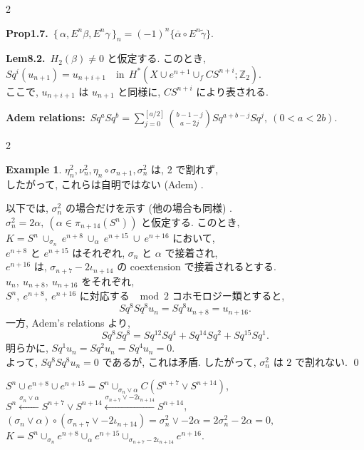 \documentclass[10pt, leqno]{ltjsarticle}
\newcommand{\todai}[2][]{\{\,#2\,\}_{#1}}      %
\newcommand{\gen}[1]{\{#1\}}       %
\newcommand{\pis}[2]{\pi_{#1}(#2)}       %
\newcommand{\z}{\mathbb{Z}}
\newcommand{\sq}[1]{Sq^{#1}}
\numberwithin{equation}{section}
\theoremstyle{plain}
\theoremstyle{definition}
\newtheorem{example}[]{Example}
\theoremstyle{remark}
\begin{document}
\begin{paracol}{2}
\switchcolumn

\noindent
\textbf{Prop1.7.}\
\(\todai[n]{\alpha, E^n\beta, E^n\gamma}
= (-1)^n\gen{\overline{\alpha}\circ E^n\widetilde{\gamma}}\).

\noindent
\textbf{Lem8.2.}\
$H_2(\beta)\ne0$ と仮定する. このとき,\\
\(
\sq{i}(u_{n+1}) = u_{n+i+1}
\quad\text{in} \ \ H^\ast (X\cup e^{n+1}\cup_f CS^{n+i}; \z_2).
\)\\
ここで, $u_{n+i+1}$ は $u_{n+1}$ と同様に, $CS^{n+i}$ により表される. 

\noindent
\textbf{Adem relations:}\ 
\(\sq{a}\sq{b} = \sum_{j=0}^{[a/2]}\binom{b-1-j}{a-2j}
\sq{a+b-j}\sq{j},\ (0<a<2b)\).



\end{paracol}

\begin{paracol}{2}

\begin{example}
$\eta_n^2, \nu_n^2, \eta_n\circ\sigma_{n+1}, \sigma_n^2$ は,
$2$ で割れず, \\
したがって, これらは自明ではない (Adem) . 
\end{example}

以下では, $\sigma_n^2$ の場合だけを示す (他の場合も同様) . \\
$\sigma_n^2=2\alpha,\ (\alpha\in\pis{n+14}{S^n})$ と仮定する. 
このとき,\\
\(
K = S^n\ \cup_{\sigma_n}\ e^{n+8}\ \cup_\alpha\ e^{n+15}\ \cup\ e^{n+16}
\)
において,\\
$e^{n+8}$ と $e^{n+15}$ はそれぞれ, $\sigma_n$ と $\alpha$
で接着され, \\
$e^{n+16}$ は, 
$\sigma_{n+7}-2\iota_{n+14}$ の coextension で接着されるとする. \\
$u_n,\ u_{n+8},\ u_{n+16}$ をそれぞれ, \\
$S^n,\ e^{n+8},\ e^{n+16}$ に対応する
$\mod 2$ コホモロジー類とすると, 
\[
\sq{8}\sq{8} u_n=\sq{8} u_{n+8}=u_{n+16}.
\]
一方, Adem's relations より,
\[
Sq^8 Sq^8 = Sq^{12} Sq^4 + Sq^{14} Sq^2 + Sq^{15} Sq^1 .
\]
明らかに,
\(\sq{1}u_n = \sq{2}u_n = \sq{4}u_n = 0\).\\
よって, $Sq^8 Sq^8 u_n = 0$ であるが, これは矛盾. 
したがって, $\sigma_n^2$ は $2$ で割れない.
\qed

\switchcolumn

\noindent
\(S^n\cup e^{n+8}\cup e^{n+15}
= S^n \cup _{\sigma_n\vee \alpha} C(S^{n+7}\vee S^{n+14})\),\\
\(S^n\xleftarrow{\sigma_n\vee\alpha}
S^{n+7}\vee S^{n+14}\xleftarrow{\sigma_{n+7}\vee -2\iota_{n+14}} S^{n+14}\),\\
\((\sigma_n\vee \alpha)\circ(\sigma_{n+7}\vee -2\iota_{n+14})
= \sigma_n^2\vee -2\alpha = 2\sigma_n^2 - 2\alpha = 0,\)\\
\(K = S^n\cup_{\sigma_n}e^{n+8}\cup_\alpha e^{n+15}
\cup_{\sigma_{n+7}-2\iota_{n+14}}e^{n+16}\).



\end{paracol}
\end{document}
